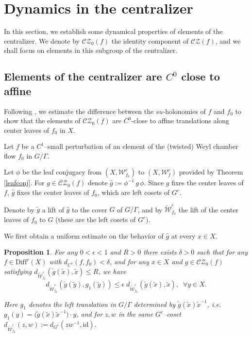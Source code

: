 \documentclass[11pt]{amsart}
\numberwithin{equation}{section}
\newcommand{\CZ}{\mathcal{CZ}}
\theoremstyle{plain}
\newtheorem{prop}[thm]{Proposition}
\begin{document}
\section{Dynamics in the centralizer}\label{sec:cla}
In this section, we establish some dynamical properties of elements of the centralizer. We denote by $\CZ_0(f)$ the identity component of $\CZ(f)$, and we shall focus on elements in this subgroup of the centralizer.

\subsection{Elements of the centralizer are $C^0$ close to affine}
Following \cite{Wang}, we estimate the difference between the $su$-holonomies
of $f$ and $f_0$ to show that the elements of $\CZ_0(f)$ are $C^0$-close to affine
translations along center leaves of $f_0$ in $X$.

Let $f$ be a $C^1$–small perturbation of an element of the (twisted) Weyl chamber flow $f_0$ in $G/\Gamma$.

Let $\phi$ be the leaf conjugacy from $(X,\mathcal W^c_{f_0})$ to
$(X,\mathcal W^c_f)$ provided by Theorem \ref{leafconj}. For
$g\in\CZ_0(f)$ denote $\hat g:=\phi^{-1}\,g\,\phi$. Since $g$ fixes the
center leaves of $f$, $\hat g$ fixes the center leaves of $f_0$, which are
left cosets of $G^c$.

Denote by $\tilde g$ a lift of $\hat g$ to the cover $G$ of $G/\Gamma$,
and by $\widetilde{\mathcal W}^c_{f_0}$ the lift of the center leaves of
$f_0$ to $G$ (these are the left cosets of $G^c$).

We first obtain a uniform estimate on the behavior of $\hat g$ at every
$x\in X$.

\begin{prop}\label{gtransl}
For any $0<\epsilon<1$ and $R>0$ there exists $\delta>0$ such that for any
$f\in\mathrm{Diff}^r(X)$ with $d_{C^1}(f,f_0)<\delta$, and for any
$x\in X$ and $g\in\CZ_0(f)$ satisfying
$d_{\widetilde{\mathcal W}^c_{f_0}}(\tilde g(\tilde x),\tilde x)\le R$, we have
\[
d_{\widetilde{\mathcal W}^c_{f_0}}(\tilde g(\tilde y),g_1(\tilde y))
\le \epsilon\; d_{\widetilde{\mathcal W}^c_{f_0}}(\tilde{g}(\tilde x),\tilde x),
\;\; \forall y\in X.
\]

Here $g_1$ denotes the left translation in $G/\Gamma$ determined by
$\tilde g(\tilde x)\tilde x^{-1}$, i.e.
$g_1(y)=\big(\tilde g(\tilde x)\tilde x^{-1}\big)\cdot y$, and for $z,w$ in the same
$G^c$–coset
$d_{\widetilde{\mathcal W}^c_{f_0}}(z,w):=d_{G^c}(z w^{-1},\mathrm{id})$.


\end{prop}
\end{document}
